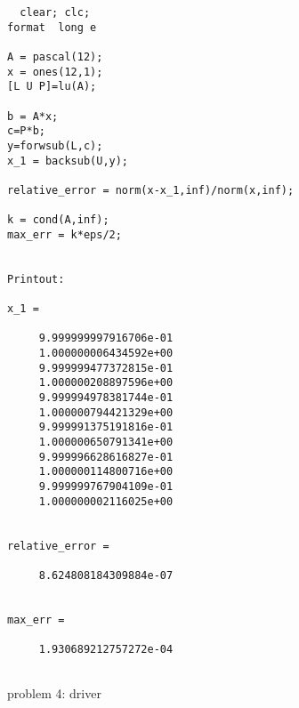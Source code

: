 \documentclass[10pt]{article}
\begin{document}
\begin{program}
 \begin{verbatim}
  clear; clc;
format  long e

A = pascal(12);
x = ones(12,1);
[L U P]=lu(A);

b = A*x;
c=P*b;
y=forwsub(L,c);
x_1 = backsub(U,y);

relative_error = norm(x-x_1,inf)/norm(x,inf);

k = cond(A,inf);
max_err = k*eps/2;


Printout:

x_1 =

     9.999999997916706e-01
     1.000000006434592e+00
     9.999999477372815e-01
     1.000000208897596e+00
     9.999994978381744e-01
     1.000000794421329e+00
     9.999991375191816e-01
     1.000000650791341e+00
     9.999996628616827e-01
     1.000000114800716e+00
     9.999999767904109e-01
     1.000000002116025e+00


relative_error =

     8.624808184309884e-07


max_err =

     1.930689212757272e-04


  \end{verbatim}
\caption{problem 4: driver}
\end{program}
\end{document}
